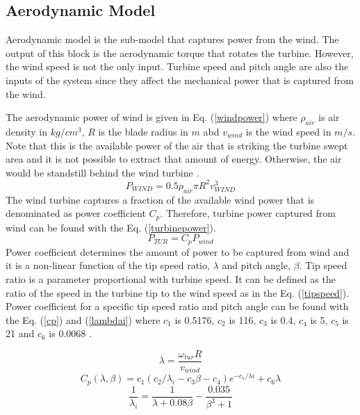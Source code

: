 \subsection{Aerodynamic Model}
Aerodynamic model is the sub-model that captures power from the wind. The output of this block is the aerodynamic torque that rotates the turbine. However, the wind speed is not the only input. Turbine speed and pitch angle are also the inputs of the system since they affect the mechanical power that is captured from the wind.\par
The aerodynamic power of wind is given in Eq. (\ref{windpower}) where $\rho_{air}$ is air density in $kg/cm^{3}$, $R$ is the blade radius in $m$ abd $v_{wind}$ is the wind speed in $m/s$. Note that this is the available power of the air that is striking the turbine swept area and it is not possible to extract that amount of energy. Otherwise, the air would be standstill behind the wind turbine \cite{Ackermann2005a}.
\begin{equation}
P_{WIND}=0.5\rho_{air}\pi R^{2} v_{WIND}^{3}
\label{windpower}
\end{equation}
The wind turbine captures a fraction of the available wind power that is denominated as power coefficient $C_{p}$. Therefore, turbine power captured from wind can be found with the Eq. (\ref{turbinepower}).
\begin{equation}
P_{TUR}=C_{p}P_{wind}
\label{turbinepower}
\end{equation}
Power coefficient determines the amount of power to be captured from wind and it is a non-linear function of the tip speed ratio, $\lambda$ and pitch angle, $\beta$. Tip speed ratio is a parameter proportional with turbine speed. It can be defined as the ratio of the speed in the turbine tip to the wind speed as in the Eq. (\ref{tipspeed}). Power coefficient for a specific tip speed ratio and pitch angle can be found with the Eq. (\ref{cp}) and (\ref{lambdai}) where $c_{1}$ is 0.5176, $c_{2}$ is 116, $c_{3}$ is 0.4, $c_{4}$ is 5, $c_{5}$ is 21 and $c_{6}$ is 0.0068 \cite{Heier}.\par
\begin{equation}
\lambda=\frac{\omega_{tur}R}{v_{wind}}
\label{tipspeed}
\end{equation}
\begin{equation}
C_{p}(\lambda,\beta)=c_{1}(c_{2}/\lambda_{i}-c_{3}\beta-c_{4})e^{-c_{5}/\lambda{i}}+c_{6}\lambda
\label{cp}
\end{equation}
\begin{equation}
\frac{1}{\lambda_{i}}=\frac{1}{\lambda+0.08\beta}-\frac{0.035}{\beta^{3}+1} 
\label{lambdai}
\end{equation}
